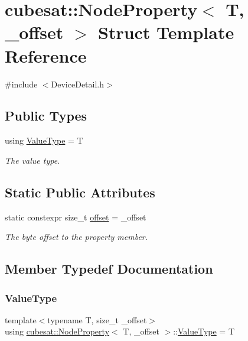 \hypertarget{structcubesat_1_1NodeProperty}{}\section{cubesat\+:\+:Node\+Property$<$ T, \+\_\+offset $>$ Struct Template Reference}
\label{structcubesat_1_1NodeProperty}


{\ttfamily \#include $<$Device\+Detail.\+h$>$}

\subsection*{Public Types}
\begin{DoxyCompactItemize}
\item 
using \hyperlink{structcubesat_1_1NodeProperty_a8d6d9fdbd56b8fdc2fe2c3b80f54846a}{Value\+Type} = T
\begin{DoxyCompactList}\small\item\em The value type. \end{DoxyCompactList}\end{DoxyCompactItemize}
\subsection*{Static Public Attributes}
\begin{DoxyCompactItemize}
\item 
static constexpr size\+\_\+t \hyperlink{structcubesat_1_1NodeProperty_a028759af3a77611ebdcbd3e4f352bfa0}{offset} = \+\_\+offset
\begin{DoxyCompactList}\small\item\em The byte offset to the property member. \end{DoxyCompactList}\end{DoxyCompactItemize}


\subsection{Member Typedef Documentation}
\mbox{\label{structcubesat_1_1NodeProperty_a8d6d9fdbd56b8fdc2fe2c3b80f54846a}} 
\subsubsection{\texorpdfstring{Value\+Type}{ValueType}}
{\footnotesize\ttfamily template$<$typename T, size\+\_\+t \+\_\+offset$>$ \\
using \hyperlink{structcubesat_1_1NodeProperty}{cubesat\+::\+Node\+Property}$<$ T, \+\_\+offset $>$\+::\hyperlink{structcubesat_1_1NodeProperty_a8d6d9fdbd56b8fdc2fe2c3b80f54846a}{Value\+Type} =  T}



